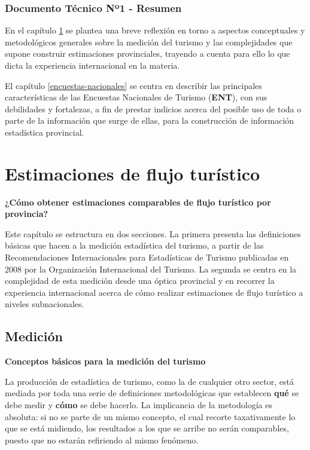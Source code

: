 \documentclass[
]{book}
\begin{document}
\hypertarget{documento-tuxe9cnico-nuxba1---resumen}{%
\subsection*{Documento Técnico Nº1 - Resumen}\label{documento-tuxe9cnico-nuxba1---resumen}}

En el capítulo \ref{flujo-turistico} se plantea una breve reflexión en torno a aspectos conceptuales y metodológicos generales sobre la medición del turismo y las complejidades que supone construir estimaciones provinciales, trayendo a cuenta para ello lo que dicta la experiencia internacional en la materia.

El capítulo \ref{encuestas-nacionales} se centra en describir las principales características de las Encuestas Nacionales de Turismo (\textbf{ENT}), con sus debilidades y fortalezas, a fin de prestar indicios acerca del posible uso de toda o parte de la información que surge de ellas, para la construcción de información estadística provincial.

\hypertarget{flujo-turistico}{%
\chapter{\texorpdfstring{\textbf{Estimaciones de flujo turístico}}{Estimaciones de flujo turístico}}\label{flujo-turistico}}

\textbf{¿Cómo obtener estimaciones comparables de flujo turístico por provincia?}

Este capítulo se estructura en dos secciones. La primera presenta las definiciones básicas que hacen a la medición estadística del turismo, a partir de las Recomendaciones Internacionales para Estadísticas de Turismo publicadas en 2008 por la Organización Internacional del Turismo. La segunda se centra en la complejidad de esta medición desde una óptica provincial y en recorrer la experiencia internacional acerca de cómo realizar estimaciones de flujo turístico a niveles subnacionales.

\hypertarget{mediciuxf3n}{%
\section{Medición}\label{mediciuxf3n}}

\textbf{Conceptos básicos para la medición del turismo}

La producción de estadística de turismo, como la de cualquier otro sector, está mediada por toda una serie de definiciones metodológicas que establecen \textbf{qué} se debe medir y \textbf{cómo} se debe hacerlo. La implicancia de la metodología es absoluta: si no se parte de un mismo concepto, el cual recorte taxativamente lo que se está midiendo, los resultados a los que se arribe no serán comparables, puesto que no estarán refiriendo al mismo fenómeno.
\end{document}
